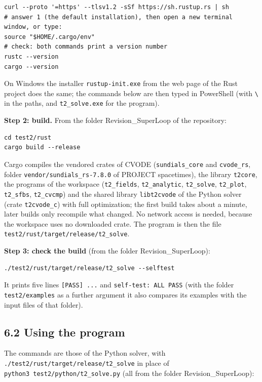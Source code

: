 \documentclass[
  10pt,
]{article}
\begin{document}
\begin{verbatim}
curl --proto '=https' --tlsv1.2 -sSf https://sh.rustup.rs | sh
# answer 1 (the default installation), then open a new terminal window, or type:
source "$HOME/.cargo/env"
# check: both commands print a version number
rustc --version
cargo --version
\end{verbatim}

On Windows the installer \texttt{rustup-init.exe} from the web page of
the Rust project does the same; the commands below are then typed in
PowerShell (with \texttt{\textbackslash{}} in the paths, and
\texttt{t2\_solve.exe} for the program).

\textbf{Step 2: build.} From the folder Revision\_SuperLoop of the
repository:

\begin{verbatim}
cd test2/rust
cargo build --release
\end{verbatim}

Cargo compiles the vendored crates of CVODE (\texttt{sundials\_core} and
\texttt{cvode\_rs}, folder \texttt{vendor/sundials\_rs-7.8.0} of PROJECT
spacetimes), the library \texttt{t2core}, the programs of the workspace
(\texttt{t2\_fields}, \texttt{t2\_analytic}, \texttt{t2\_solve},
\texttt{t2\_plot}, \texttt{t2\_sfbs}, \texttt{t2\_cvcmp}) and the shared
library \texttt{libt2cvode} of the Python solver (crate
\texttt{t2cvode\_c}) with full optimization; the first build takes about
a minute, later builds only recompile what changed. No network access is
needed, because the workspace uses no downloaded crate. The program is
then the file \texttt{test2/rust/target/release/t2\_solve}.

\textbf{Step 3: check the build} (from the folder Revision\_SuperLoop):

\begin{verbatim}
./test2/rust/target/release/t2_solve --selftest
\end{verbatim}

It prints five lines \texttt{{[}PASS{]}\ ...} and
\texttt{self-test:\ ALL\ PASS} (with the folder \texttt{test2/examples}
as a further argument it also compares its examples with the input files
of that folder).

\hypertarget{using-the-program}{%
\subsection{6.2 Using the program}\label{using-the-program}}

The commands are those of the Python solver, with
\texttt{./test2/rust/target/release/t2\_solve} in place of
\texttt{python3\ test2/python/t2\_solve.py} (all from the folder
Revision\_SuperLoop):
\end{document}
